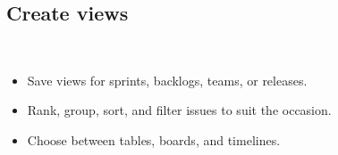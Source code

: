 \subsection{Create views}
\begin{frame}
  \frametitle{\insertsectionhead}
  \framesubtitle{\insertsubsectionhead}
  \begin{columns}
    \begin{itemize}
      \item Save views for sprints, backlogs, teams, or releases. 
      \item Rank, group, sort, and filter issues to suit the occasion. 
      \item Choose between tables, boards, and timelines.
    \end{itemize}

\end{columns}
\end{frame}
